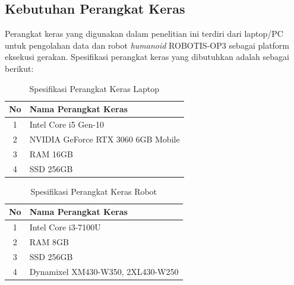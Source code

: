 \subsection{Kebutuhan Perangkat Keras}
Perangkat keras yang digunakan dalam penelitian ini terdiri dari laptop/PC untuk pengolahan data dan robot \textit{humanoid} ROBOTIS-OP3 sebagai platform eksekusi gerakan. Spesifikasi perangkat keras yang dibutuhkan adalah sebagai berikut:

\begin{longtable}{|c|p{9cm}|}
    \caption{Spesifikasi Perangkat Keras Laptop}
    \label{tab:spesifikasi_laptop} \\
    \hline
    \textbf{No} & \textbf{Nama Perangkat Keras} \\
    \hline
    \endfirsthead
    
    \endhead
    
    \hline
    \endfoot
    
    \hline
    \endlastfoot
    
    1 & Intel Core i5 Gen-10 \\ \hline
    2 & NVIDIA GeForce RTX 3060 6GB Mobile \\ \hline
    3 & RAM 16GB \\ \hline
    4 & SSD 256GB \\ \hline
    
\end{longtable}
    
\begin{longtable}{|c|p{9cm}|}
    \caption{Spesifikasi Perangkat Keras Robot}
    \label{tab:spesifikasi_robot} \\
    \hline
    \textbf{No} & \textbf{Nama Perangkat Keras} \\
    \hline
    \endfirsthead
    
    \endhead
    
    \hline
    \endfoot
    
    \hline
    \endlastfoot
    
    1 & Intel Core i3-7100U \\ \hline
    2 & RAM 8GB \\ \hline
    3 & SSD 256GB \\ \hline
    4 & Dynamixel XM430-W350, 2XL430-W250 \\ \hline
    
\end{longtable}
        
